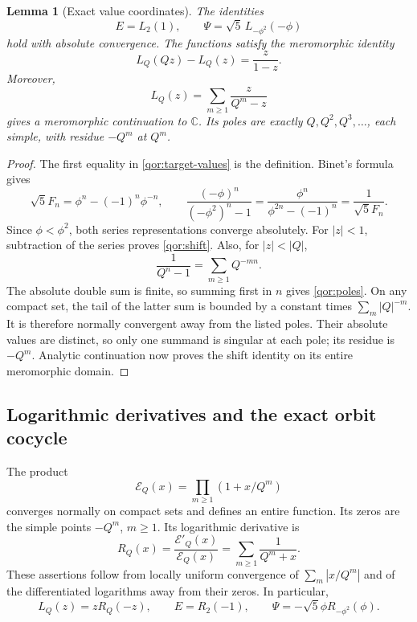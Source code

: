 \documentclass[11pt,a4paper]{article}
\newtheorem{lemma}[theorem]{Lemma}
\theoremstyle{definition}\newtheorem{definition}[theorem]{Definition}
\theoremstyle{remark}\newtheorem{remark}[theorem]{Remark}
\begin{document}
\begin{lemma}[Exact value coordinates]\label{qor:coordinates}
The identities
\begin{equation}\label{qor:target-values}
 E=L_2(1),\qquad \Psi=\sqrt5\,L_{-\phi^2}(-\phi)
\end{equation}
hold with absolute convergence.  The functions satisfy the meromorphic
identity
\begin{equation}\label{qor:shift}
 L_Q(Qz)-L_Q(z)=\frac{z}{1-z}.
\end{equation}
Moreover,
\begin{equation}\label{qor:poles}
 L_Q(z)=\sum_{m\geq1}\frac{z}{Q^m-z}
\end{equation}
gives a meromorphic continuation to $\mathbb C$.  Its poles are exactly
$Q,Q^2,Q^3,\ldots$, each simple, with residue $-Q^m$ at $Q^m$.
\end{lemma}
\begin{proof}
The first equality in \eqref{qor:target-values} is the definition.
Binet's formula gives
\[
 \sqrt5 F_n=\phi^n-(-1)^n\phi^{-n},\qquad
 \frac{(-\phi)^n}{(-\phi^2)^n-1}
 =\frac{\phi^n}{\phi^{2n}-(-1)^n}
 =\frac1{\sqrt5 F_n}.
\]
Since $\phi<\phi^2$, both series representations converge absolutely.
For $|z|<1$, subtraction of the series proves
\eqref{qor:shift}.  Also, for $|z|<|Q|$,
\[
 \frac1{Q^n-1}=\sum_{m\geq1}Q^{-mn}.
\]
The absolute double sum is finite, so summing first in $n$ gives
\eqref{qor:poles}.  On any compact set, the tail of the latter sum
is bounded by a constant times $\sum_m|Q|^{-m}$.  It is therefore
normally convergent away from the listed poles.  Their absolute
values are distinct, so only one summand is singular at each pole;
its residue is $-Q^m$.  Analytic continuation now proves the shift
identity on its entire meromorphic domain.
\end{proof}

\subsection{Logarithmic derivatives and the exact orbit cocycle}

The product
\begin{equation}\label{qor:E-product}
 \mathcal E_Q(x)=\prod_{m\geq1}(1+x/Q^m)
\end{equation}
converges normally on compact sets and defines an entire function.
Its zeros are the simple points $-Q^m$, $m\geq1$.  Its logarithmic
derivative is
\begin{equation}\label{qor:R}
 R_Q(x)=\frac{\mathcal E'_Q(x)}{\mathcal E_Q(x)}
       =\sum_{m\geq1}\frac1{Q^m+x}.
\end{equation}
These assertions follow from locally uniform convergence of
$\sum_m|x/Q^m|$ and of the differentiated logarithms away from
their zeros.  In particular,
\begin{equation}\label{qor:R-values}
 L_Q(z)=zR_Q(-z),\qquad
 E=R_2(-1),\qquad
 \Psi=-\sqrt5\phi R_{-\phi^2}(\phi).
\end{equation}
\end{document}
